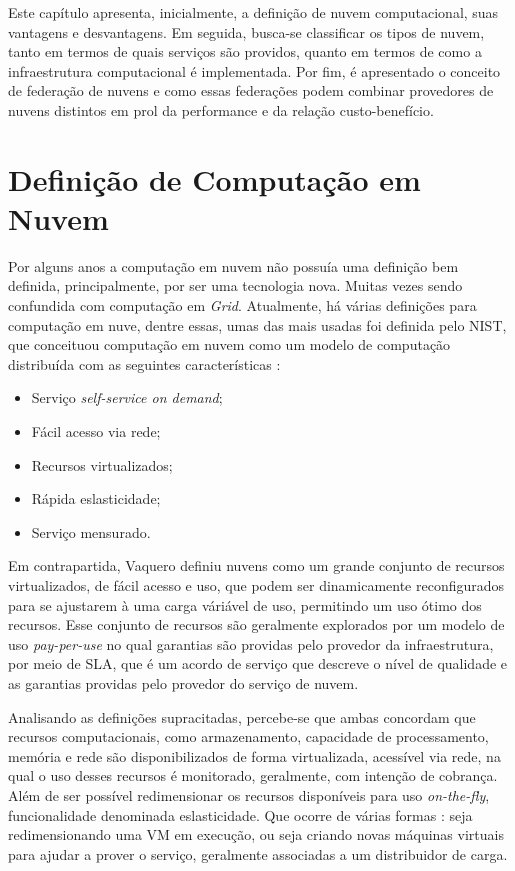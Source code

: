 Este capítulo apresenta, inicialmente, a definição de nuvem computacional, suas vantagens e desvantagens. Em seguida, busca-se classificar os tipos de nuvem, tanto em termos de quais serviços são providos, quanto em termos de como a infraestrutura computacional é implementada. Por fim, é apresentado o conceito de federação de nuvens e como essas federações podem combinar provedores de nuvens distintos em prol da performance e da relação custo-benefício.

\section{Definição de Computação em Nuvem}

Por alguns anos a computação em nuvem não possuía uma definição bem definida, principalmente, por ser uma tecnologia nova. Muitas vezes sendo confundida com computação em \textit{Grid}\cite{Vaquero:2008:BCT:1496091.1496100_Cloud_definition}. Atualmente, há várias definições para computação em nuve, dentre essas, umas das mais usadas foi definida pelo \acrfull{NIST}, que conceituou computação em nuvem como um modelo de computação distribuída com as seguintes características \cite{NIST_CLOUD_DEFINITION}: 
\begin{itemize}
	\item Serviço \textit{self-service on demand};
	\item Fácil acesso via rede;
	\item Recursos virtualizados;
	\item Rápida eslasticidade; 
	\item Serviço mensurado.
\end{itemize}

Em contrapartida, Vaquero\cite{Vaquero:2008:BCT:1496091.1496100_Cloud_definition} definiu nuvens como um grande conjunto de recursos virtualizados, de fácil acesso e uso, que podem ser dinamicamente reconfigurados para se ajustarem à uma carga váriável de uso, permitindo um uso ótimo dos recursos. Esse conjunto de recursos são geralmente explorados por um modelo de uso \textit{pay-per-use} no qual garantias são providas pelo provedor da infraestrutura, por meio de \acrfull{SLA}, que é um acordo de serviço que descreve o nível de qualidade e as garantias providas pelo provedor do serviço de nuvem.

Analisando as definições supracitadas, percebe-se que ambas concordam que recursos computacionais, como armazenamento, capacidade de processamento, memória e rede são disponibilizados de forma virtualizada, acessível via rede, na qual o uso desses recursos é monitorado, geralmente, com intenção de cobrança. Além de ser possível redimensionar os recursos disponíveis para uso \textit{on-the-fly}, funcionalidade denominada eslasticidade. Que ocorre de várias formas \cite{Coutinho2015}: seja redimensionando uma \acrshort{VM} em execução, ou seja criando novas máquinas virtuais para ajudar a prover o serviço, geralmente associadas a um distribuidor de carga.

